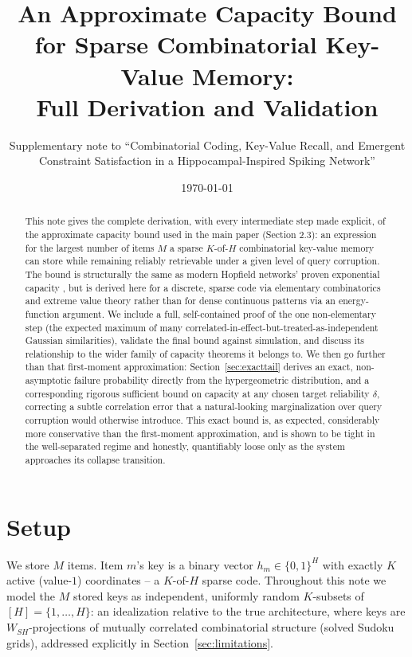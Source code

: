 \documentclass[11pt]{article}
\title{An Approximate Capacity Bound for Sparse Combinatorial Key-Value Memory:\\
Full Derivation and Validation}
\author{Supplementary note to ``Combinatorial Coding, Key-Value Recall, and Emergent\\
Constraint Satisfaction in a Hippocampal-Inspired Spiking Network''}
\date{\today}
\begin{document}
\maketitle

\begin{abstract}
This note gives the complete derivation, with every intermediate step made explicit, of the
approximate capacity bound used in the main paper (Section 2.3): an expression for the largest
number of items $M$ a sparse $K$-of-$H$ combinatorial key-value memory can store while
remaining reliably retrievable under a given level of query corruption. The bound is
structurally the same as modern Hopfield networks' proven exponential capacity
\cite{ramsauer2020}, but is derived here for a discrete, sparse code via elementary
combinatorics and extreme value theory rather than for dense continuous patterns via an
energy-function argument. We include a full, self-contained proof of the one non-elementary
step (the expected maximum of many correlated-in-effect-but-treated-as-independent Gaussian
similarities), validate the final bound against simulation, and discuss its relationship to
the wider family of capacity theorems it belongs to. We then go further than that first-moment
approximation: Section~\ref{sec:exacttail} derives an exact, non-asymptotic failure probability
directly from the hypergeometric distribution, and a corresponding rigorous sufficient bound on
capacity at any chosen target reliability $\delta$, correcting a subtle correlation error that a
natural-looking marginalization over query corruption would otherwise introduce. This exact
bound is, as expected, considerably more conservative than the first-moment approximation, and
is shown to be tight in the well-separated regime and honestly, quantifiably loose only as the
system approaches its collapse transition.
\end{abstract}

\section{Setup}

We store $M$ items. Item $m$'s key is a binary vector $h_m \in \{0,1\}^H$ with exactly $K$
active (value-$1$) coordinates -- a $K$-of-$H$ sparse code. Throughout this note we model the
$M$ stored keys as independent, uniformly random $K$-subsets of $[H] = \{1,\dots,H\}$: an
idealization relative to the true architecture, where keys are $W_{SH}$-projections of
mutually correlated combinatorial structure (solved Sudoku grids), addressed explicitly in
Section~\ref{sec:limitations}.
\end{document}
